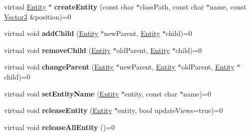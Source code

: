\begin{DoxyCompactItemize}
\item 
virtual \hyperlink{class_magnum_1_1_entity}{Entity} $\ast$ {\bfseries create\+Entity} (const char $\ast$class\+Path, const char $\ast$name, const \hyperlink{class_magnum_1_1_vector3}{Vector3} \&position)=0\hypertarget{class_magnum_1_1_project_model_base_a6762fd884fcfa5b5feefd979c32dbc2e}{}\label{class_magnum_1_1_project_model_base_a6762fd884fcfa5b5feefd979c32dbc2e}

\item 
virtual void {\bfseries add\+Child} (\hyperlink{class_magnum_1_1_entity}{Entity} $\ast$new\+Parent, \hyperlink{class_magnum_1_1_entity}{Entity} $\ast$child)=0\hypertarget{class_magnum_1_1_project_model_base_a9f8b0862b042a3a13e01ef8c755b5400}{}\label{class_magnum_1_1_project_model_base_a9f8b0862b042a3a13e01ef8c755b5400}

\item 
virtual void {\bfseries remove\+Child} (\hyperlink{class_magnum_1_1_entity}{Entity} $\ast$old\+Parent, \hyperlink{class_magnum_1_1_entity}{Entity} $\ast$child)=0\hypertarget{class_magnum_1_1_project_model_base_a677c55aa7d43fa463bf5d632edf32039}{}\label{class_magnum_1_1_project_model_base_a677c55aa7d43fa463bf5d632edf32039}

\item 
virtual void {\bfseries change\+Parent} (\hyperlink{class_magnum_1_1_entity}{Entity} $\ast$new\+Parent, \hyperlink{class_magnum_1_1_entity}{Entity} $\ast$old\+Parent, \hyperlink{class_magnum_1_1_entity}{Entity} $\ast$child)=0\hypertarget{class_magnum_1_1_project_model_base_aa8e21b949c0a063d197262c91a69e3a8}{}\label{class_magnum_1_1_project_model_base_aa8e21b949c0a063d197262c91a69e3a8}

\item 
virtual void {\bfseries set\+Entity\+Name} (\hyperlink{class_magnum_1_1_entity}{Entity} $\ast$entity, const char $\ast$name)=0\hypertarget{class_magnum_1_1_project_model_base_ae75fa9e67bf7037fec401d295166246a}{}\label{class_magnum_1_1_project_model_base_ae75fa9e67bf7037fec401d295166246a}

\item 
virtual void {\bfseries release\+Entity} (\hyperlink{class_magnum_1_1_entity}{Entity} $\ast$entity, bool update\+Views=true)=0\hypertarget{class_magnum_1_1_project_model_base_abc92526a2f1558491191eda6accddbe9}{}\label{class_magnum_1_1_project_model_base_abc92526a2f1558491191eda6accddbe9}

\item 
virtual void {\bfseries release\+All\+Entity} ()=0\hypertarget{class_magnum_1_1_project_model_base_ab461f12bacfc2f0e6b7693e94b6d37cd}{}\label{class_magnum_1_1_project_model_base_ab461f12bacfc2f0e6b7693e94b6d37cd}


\end{DoxyCompactItemize}
